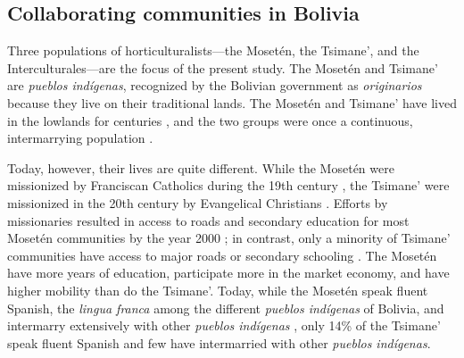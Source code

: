 \documentclass[bibauthoryear]{aa}
\begin{document}
\subsection{Collaborating communities in Bolivia}\label{pops2}
Three populations of horticulturalists---the Moset\'en, the Tsimane’, and the Interculturales---are the focus of the present study. The Moset\'en and Tsimane’ are \textit{pueblos ind\'igenas}, recognized by the Bolivian government as \textit{originarios} because they live on their traditional lands. The Moset\'en and Tsimane’ have lived in the lowlands for centuries  \citep{godoy2015natural, tomas2008tsimane}, and the two groups were once a continuous, intermarrying population \citep{bert2001major, godoy2015natural, gurven2007mortality, sakel2011moseten, ringhofer2010exploring}. 

Today, however, their lives are quite different. While the Moset\'en were missionized by Franciscan Catholics during the 19th century \citep{godoy2015natural, mamani2010tsinsi, ref947717999}, the Tsimane' were missionized in the 20th century by Evangelical Christians \citep{tomas2008tsimane}. Efforts by missionaries resulted in access to roads and secondary education for most Moset\'en communities by the year 2000 \citep{pisor2018diversify}; in contrast,  only a minority of Tsimane' communities have access to major roads or secondary schooling \citep{ringhofer2010exploring}. 
The Moset\'en have more years of education, participate more in the market economy, and have higher mobility than do the Tsimane'. Today, while the Moset\'en speak fluent Spanish, the \textit{lingua franca} among the different \textit{pueblos ind\'igenas} of Bolivia, and intermarry extensively with other \textit{pueblos ind\'igenas} \citep{pisor2018diversify}, only 14\% of the Tsimane' speak fluent Spanish \citep{pisor2016risk} and few have intermarried with other \textit{pueblos ind\'igenas}.
\end{document}
